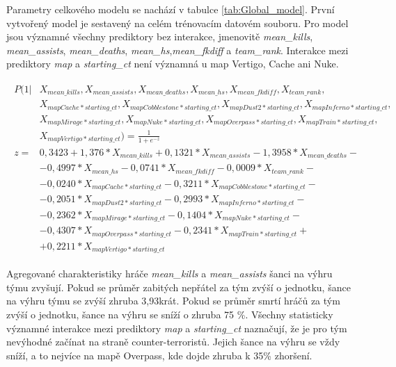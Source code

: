 

Parametry celkového modelu se nachází v tabulce \ref{tab:Global_model}. První vytvořený model je sestavený na celém trénovacím datovém souboru. Pro model jsou
významné všechny prediktory bez interakce, jmenovitě \textit{mean\_kills}, \textit{mean\_assists}, \textit{mean\_deaths}, \textit{mean\_hs},\textit{mean\_fkdiff} a
\textit{team\_rank}. Interakce mezi prediktory \textit{map} a \textit{starting\_ct} není významná u map Vertigo, Cache ani Nuke.

\begin{align}
    \begin{split}
        P(1 | &X_{mean\_kills}, X_{mean\_assists}, X_{mean\_deaths}, X_{mean\_hs}, X_{mean\_fkdiff}, X_{team\_rank}, \\
              &X_{mapCache*starting\_ct}, X_{mapCobblestone*starting\_ct}, X_{mapDust2*starting\_ct}, X_{mapInferno*starting\_ct}, \\
              &X_{mapMirage*starting\_ct}, X_{mapNuke*starting\_ct}, X_{mapOverpass*starting\_ct}, X_{mapTrain*starting\_ct}, \\
              &X_{mapVertigo*starting\_ct}) = \frac{1}{1 + e^{-z}} \\
        z = &  0,3423 + 1,376*X_{mean\_kills} + 0,1321*X_{mean\_assists} - 1,3958*X_{mean\_deaths} - \\
            &- 0,4997*X_{mean\_hs} - 0,0741*X_{mean\_fkdiff} - 0,0009*X_{team\_rank} - \\
            &- 0,0240*X_{mapCache*starting\_ct} - 0,3211*X_{mapCobblestone*starting\_ct} - \\
            &- 0,2051*X_{mapDust2*starting\_ct} - 0,2993*X_{mapInferno*starting\_ct} - \\
            &- 0,2362*X_{mapMirage*starting\_ct} - 0,1404*X_{mapNuke*starting\_ct} - \\
            &- 0,4307*X_{mapOverpass*starting\_ct} - 0,2341*X_{mapTrain*starting\_ct} + \\
            &+ 0,2211*X_{mapVertigo*starting\_ct}
    \end{split}
\end{align}

Agregované charakteristiky hráče \textit{mean\_kills} a \textit{mean\_assists} šanci na výhru týmu zvyšují. Pokud se průměr zabitých nepřátel za tým zvýší o jednotku,
šance na výhru týmu se zvýší zhruba 3,93krát. Pokud se průměr smrtí hráčů za tým zvýší o jednotku, šance na výhru se sníží o zhruba 75 \%. Všechny statisticky
významné interakce mezi prediktory \textit{map} a \textit{starting\_ct} naznačují, že je pro tým nevýhodné začínat na straně counter-terroristů. Jejich šance
na výhru se vždy sníží, a to nejvíce na mapě Overpass, kde dojde zhruba k 35\% zhoršení.

